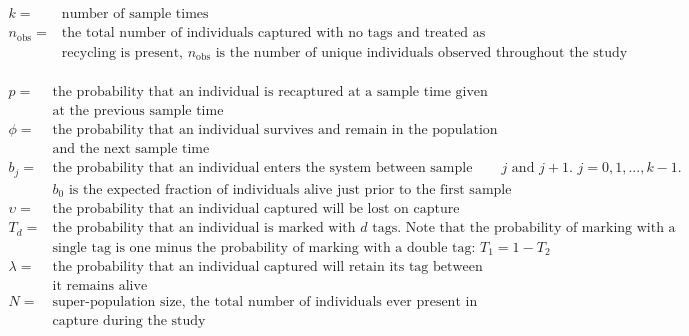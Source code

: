 \documentclass[]{article}
\begin{document}
\[
  \begin{array}{ll}
      k= & \text{number of sample times} \\
      n_{\text{obs}}= & \text{the total number of individuals captured with no tags and treated as new individuals; when no}\\
      & \text{recycling is present, $n_\text{obs}$ is the number of unique individuals observed throughout the study}\\
  \end{array}
\]

\[
  \begin{array}{ll}
      p= & \text{the probability that an individual is recaptured at a sample time given that the individual was alive}\\
      & \text{at the previous sample time} \\
      \phi=  & \text{the probability that an individual survives and remain in the population between a sample time}\\
      & \text{and the next sample time }\\
      b_j= & \text{the probability that an individual enters the system between sample times $j$ and $j+1$. $j=0,1,...,k-1$.}\\
       & \text{$b_0$ is the expected fraction of individuals alive just prior to the first sample time.}\\
      \upsilon= & \text{the probability that an individual captured will be lost on capture}\\
      T_d= & \text{the probability that an individual is marked with $d$ tags. Note that the probability of marking with a }\\
      & \text{single tag is one minus the probability of marking with a double tag: $T_1=1-T_2$}\\
      \lambda= & \text{the probability that an individual captured will  retain its tag between time periods given that}\\
      & \text{it remains alive}\\
      N= & \text{super-population size, the total number of individuals ever present in population and available for}\\
      & \text{capture during the study}\\
  \end{array}
\]

\clearpage
\end{document}

